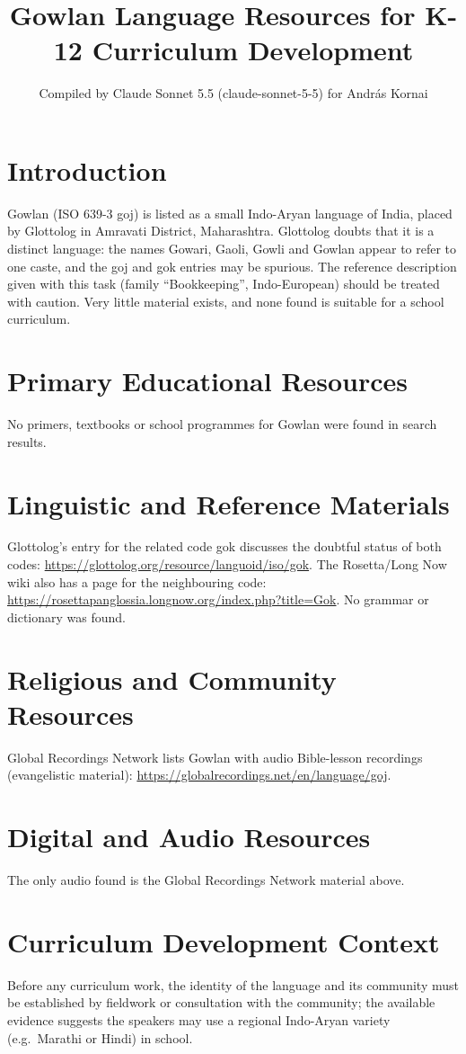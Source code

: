 \documentclass[12pt]{article}
\title{Gowlan Language Resources for K-12 Curriculum Development}
\author{Compiled by Claude Sonnet 5.5 (claude-sonnet-5-5) for Andr\'as Kornai}
\date{}
\begin{document}
\maketitle

\section{Introduction}
Gowlan (ISO 639-3 goj) is listed as a small Indo-Aryan language of India, placed by Glottolog in Amravati District, Maharashtra. Glottolog doubts that it is a distinct language: the names Gowari, Gaoli, Gowli and Gowlan appear to refer to one caste, and the goj and gok entries may be spurious. The reference description given with this task (family ``Bookkeeping'', Indo-European) should be treated with caution. Very little material exists, and none found is suitable for a school curriculum.

\section{Primary Educational Resources}
No primers, textbooks or school programmes for Gowlan were found in search results.

\section{Linguistic and Reference Materials}
Glottolog's entry for the related code gok discusses the doubtful status of both codes: \url{https://glottolog.org/resource/languoid/iso/gok}. The Rosetta/Long Now wiki also has a page for the neighbouring code: \url{https://rosettapanglossia.longnow.org/index.php?title=Gok}. No grammar or dictionary was found.

\section{Religious and Community Resources}
Global Recordings Network lists Gowlan with audio Bible-lesson recordings (evangelistic material): \url{https://globalrecordings.net/en/language/goj}.

\section{Digital and Audio Resources}
The only audio found is the Global Recordings Network material above.

\section{Curriculum Development Context}
Before any curriculum work, the identity of the language and its community must be established by fieldwork or consultation with the community; the available evidence suggests the speakers may use a regional Indo-Aryan variety (e.g.\ Marathi or Hindi) in school.
\end{document}
